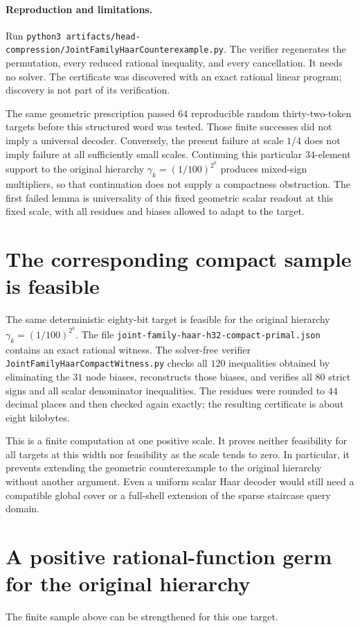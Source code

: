 \documentclass{article}
\begin{document}
\paragraph{Reproduction and limitations.}
Run \texttt{python3 artifacts/head-compression/JointFamilyHaarCounterexample.py}.
The verifier regenerates the permutation, every reduced rational
inequality, and every cancellation.  It needs no solver.  The certificate
was discovered with an exact rational linear program; discovery is not
part of its verification.

The same geometric prescription passed $64$ reproducible random
thirty-two-token targets before this structured word was tested.  Those
finite successes did not imply a universal decoder.  Conversely, the
present failure at scale $1/4$ does not imply failure at all sufficiently
small scales.  Continuing this particular $34$-element support to the
original hierarchy $\gamma_k=(1/100)^{2^k}$ produces mixed-sign
multipliers, so that continuation does not supply a compactness
obstruction.  The first failed lemma is universality of this fixed
geometric scalar readout at this fixed scale, with all residues and biases
allowed to adapt to the target.

\section{The corresponding compact sample is feasible}
The same deterministic eighty-bit target is feasible for the original
hierarchy $\gamma_k=(1/100)^{2^k}$. The file
\texttt{joint-family-haar-h32-compact-primal.json} contains an exact rational
witness. The solver-free verifier
\texttt{JointFamilyHaarCompactWitness.py} checks all $120$ inequalities
obtained by eliminating the $31$ node biases, reconstructs those biases,
and verifies all $80$ strict signs and all scalar denominator inequalities.
The residues were rounded to $44$ decimal places and then checked again
exactly; the resulting certificate is about eight kilobytes.

This is a finite computation at one positive scale. It proves neither
feasibility for all targets at this width nor feasibility as the scale
tends to zero. In particular, it prevents extending the geometric
counterexample to the original hierarchy without another argument.
Even a uniform scalar Haar decoder would still need a compatible global
cover or a full-shell extension of the sparse staircase query domain.


\section{A positive rational-function germ for the original hierarchy}
The finite sample above can be strengthened for this one target.
\end{document}
